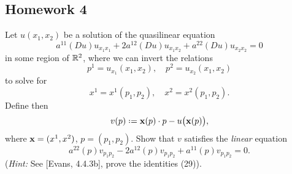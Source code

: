 \subsection{Homework 4}
\begin{problem}
  Let \(u(x_1,x_2)\) be a solution of the quasilinear equation
  \[
    a^{11}(Du)u_{x_1x_1}+ 2a^{12}(Du)u_{x_1x_2}+a^{22}(Du)u_{x_2x_2}=0
  \]
  in some region of \(\mathbb{R}^2\), where we can invert the relations
  \[
    p^1=u_{x_1}(x_1,x_2),\quad p^2=u_{x_2}(x_1,x_2)
  \]
  to solve for
  \[
    x^1=x^1(p_1,p_2),\quad x^2=x^2(p_1,p_2).
  \]
  Define then
  \[
    v(p)\defeq \bfx(p)\cdot p-u\bigl(\bfx(p)\bigr),
  \]
  where \(\mathbf{x}=(x^1,x^2)\), \(p=(p_1,p_2)\). Show that \(v\) satisfies the
  \emph{linear} equation
  \[
    a^{22}(p)v_{p_1p_2}-2a^{12}(p)v_{p_1p_2}+a^{11}(p)v_{p_1p_2}=0.
  \]
  (\emph{Hint:} See [Evans, 4.4.3b], prove the identities (29)).
\end{problem}
